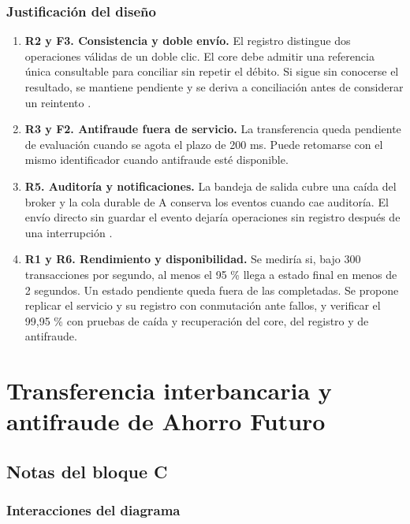 \documentclass[12pt,a4paper]{article}
\begin{document}
\subsubsection{Justificación del diseño}

\begin{enumerate}
    \item \textbf{R2 y F3. Consistencia y doble envío.}
    El registro distingue dos operaciones válidas de un doble clic. El core debe admitir una referencia única consultable para conciliar sin repetir el débito. Si sigue sin conocerse el resultado, se mantiene pendiente y se deriva a conciliación antes de considerar un reintento \cite{featonbyretries}.

    \item \textbf{R3 y F2. Antifraude fuera de servicio.}
    La transferencia queda pendiente de evaluación cuando se agota el plazo de 200 ms. Puede retomarse con el mismo identificador cuando antifraude esté disponible.

    \item \textbf{R5. Auditoría y notificaciones.}
    La bandeja de salida cubre una caída del broker y la cola durable de A conserva los eventos cuando cae auditoría. El envío directo sin guardar el evento dejaría operaciones sin registro después de una interrupción \cite{awsoutbox}.

    \item \textbf{R1 y R6. Rendimiento y disponibilidad.}
    Se mediría si, bajo 300 transacciones por segundo, al menos el 95 \% llega a estado final en menos de 2 segundos. Un estado pendiente queda fuera de las completadas. Se propone replicar el servicio y su registro con conmutación ante fallos, y verificar el 99,95 \% con pruebas de caída y recuperación del core, del registro y de antifraude.

\end{enumerate}

\section{Transferencia interbancaria y antifraude de Ahorro Futuro}

\subsection{Notas del bloque C}

\subsubsection{Interacciones del diagrama}
\end{document}

